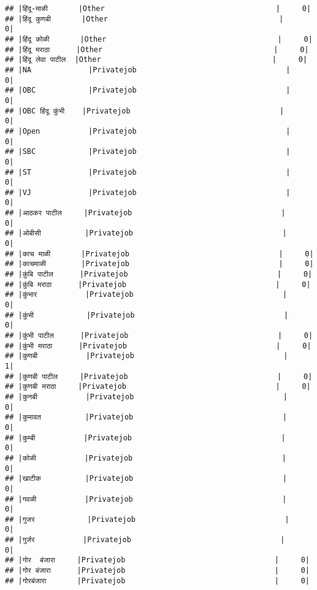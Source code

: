 \documentclass[
]{article}
\begin{document}
\begin{verbatim}
## |हिंदू-माळी       |Other                                       |     0|
## |हिंदू कुणबी       |Other                                       |     0|
## |हिंदू कोळी       |Other                                       |     0|
## |हिंदू मराठा      |Other                                       |     0|
## |हिंदू लेवा पाटील  |Other                                       |     0|
## |NA             |Privatejob                                  |     0|
## |OBC            |Privatejob                                  |     0|
## |OBC हिंदू कुंभी    |Privatejob                                  |     0|
## |Open           |Privatejob                                  |     0|
## |SBC            |Privatejob                                  |     0|
## |ST             |Privatejob                                  |     0|
## |VJ             |Privatejob                                  |     0|
## |आठकर पाटील     |Privatejob                                  |     0|
## |ओबीसी          |Privatejob                                  |     0|
## |काच माळी       |Privatejob                                  |     0|
## |काचमाळी        |Privatejob                                  |     0|
## |कुंबि पाटील      |Privatejob                                  |     0|
## |कुंबि मराठा      |Privatejob                                  |     0|
## |कुंभार           |Privatejob                                  |     0|
## |कुंभी            |Privatejob                                  |     0|
## |कुंभी पाटील      |Privatejob                                  |     0|
## |कुंभी मराठा      |Privatejob                                  |     0|
## |कुणबी           |Privatejob                                  |     1|
## |कुणबी पाटील     |Privatejob                                  |     0|
## |कुणबी मराठा     |Privatejob                                  |     0|
## |कुनबी           |Privatejob                                  |     0|
## |कुमावत          |Privatejob                                  |     0|
## |कुम्बी           |Privatejob                                  |     0|
## |कोळी           |Privatejob                                  |     0|
## |खाटीक          |Privatejob                                  |     0|
## |गवळी           |Privatejob                                  |     0|
## |गुजर            |Privatejob                                  |     0|
## |गुर्जर           |Privatejob                                  |     0|
## |गोर  बंजारा     |Privatejob                                  |     0|
## |गोर बंजारा      |Privatejob                                  |     0|
## |गोरबंजारा       |Privatejob                                  |     0|

\end{verbatim}
\end{document}
